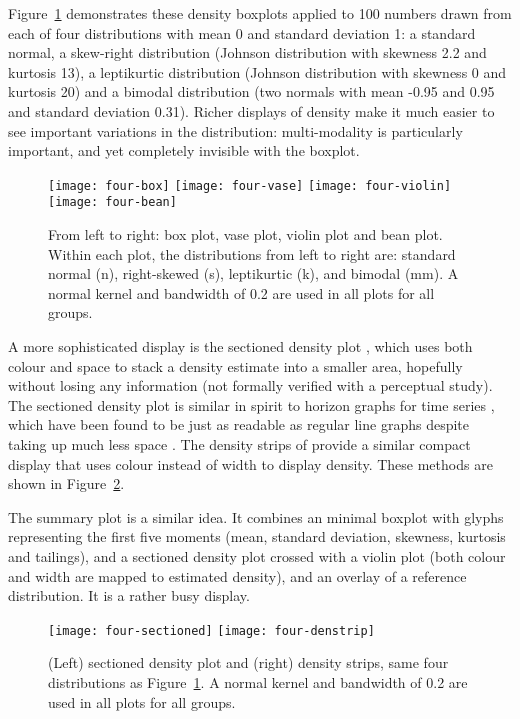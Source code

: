 \documentclass[oneside]{article}
\begin{document}
Figure~\ref{fig:density} demonstrates these density boxplots applied to 100 numbers drawn from each of four distributions with mean 0 and standard deviation 1: a standard normal, a skew-right distribution (Johnson distribution with skewness 2.2 and kurtosis 13), a leptikurtic distribution (Johnson distribution with skewness 0 and kurtosis 20) and a bimodal distribution (two normals with mean -0.95 and 0.95 and standard deviation 0.31). Richer displays of density make it much easier to see important variations in the distribution: multi-modality is particularly important, and yet completely invisible with the boxplot.

\begin{figure}[htbp]
  \centering
  \texttt{[image: four-box]}%
  \texttt{[image: four-vase]}%
  \texttt{[image: four-violin]}%
  \texttt{[image: four-bean]}
  \caption{From left to right: box plot, vase plot, violin plot and bean plot.  
Within each plot, the distributions from left to right are: standard normal (n), right-skewed (s), leptikurtic (k), and bimodal (mm). A normal kernel and bandwidth of 0.2 are used in all plots for all groups.}
  \label{fig:density}
\end{figure}

A more sophisticated display is the sectioned density plot \citep{cohen:2006}, which uses both colour and space to stack a density estimate into a smaller area, hopefully without losing any information (not formally verified with a perceptual study). The sectioned density plot is similar in spirit to horizon graphs for time series \citep{reijner:2008}, which have been found to be just as readable as regular line graphs despite taking up much less space \citep{heer:2009}. The density strips of \citet{jackson:2008} provide a similar compact display that uses colour instead of width to display density. These methods are shown in Figure~\ref{fig:density-display}. 

The summary plot \citep{potter:2010} is a similar idea. It combines an minimal boxplot with glyphs representing the first five moments (mean, standard deviation, skewness, kurtosis and tailings), and a sectioned density plot crossed with a violin plot (both colour and width are mapped to estimated density), and an overlay of a reference distribution. It is a rather busy display.

\begin{figure}[htbp]
  \centering
  \texttt{[image: four-sectioned]}%
  \texttt{[image: four-denstrip]}
  \caption{(Left) sectioned density plot and (right) density strips, same four distributions as Figure~\ref{fig:density}. A normal kernel and bandwidth of 0.2 are used in all plots for all groups.}
  \label{fig:density-display}
\end{figure}
\end{document}
